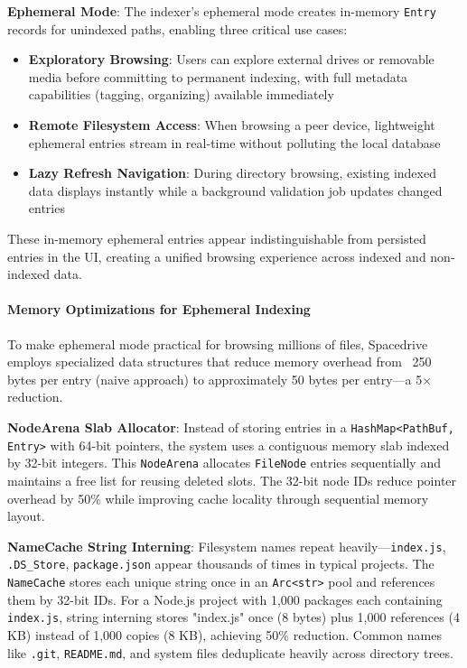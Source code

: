 \documentclass[sigconf]{acmart}
\begin{document}
\textbf{Ephemeral Mode}: The indexer's ephemeral mode creates in-memory \texttt{Entry} records for unindexed paths, enabling three critical use cases:

\begin{itemize}[noitemsep, topsep=0pt]
 \item \textbf{Exploratory Browsing}: Users can explore external drives or removable media before committing to permanent indexing, with full metadata capabilities (tagging, organizing) available immediately
 \item \textbf{Remote Filesystem Access}: When browsing a peer device, lightweight ephemeral entries stream in real-time without polluting the local database
 \item \textbf{Lazy Refresh Navigation}: During directory browsing, existing indexed data displays instantly while a background validation job updates changed entries
\end{itemize}

These in-memory ephemeral entries appear indistinguishable from persisted entries in the UI, creating a unified browsing experience across indexed and non-indexed data.

\paragraph{Memory Optimizations for Ephemeral Indexing}

To make ephemeral mode practical for browsing millions of files, Spacedrive employs specialized data structures that reduce memory overhead from ~250 bytes per entry (naive approach) to approximately 50 bytes per entry---a 5× reduction.

\textbf{NodeArena Slab Allocator}: Instead of storing entries in a \texttt{HashMap<PathBuf, Entry>} with 64-bit pointers, the system uses a contiguous memory slab indexed by 32-bit integers. This \texttt{NodeArena} allocates \texttt{FileNode} entries sequentially and maintains a free list for reusing deleted slots. The 32-bit node IDs reduce pointer overhead by 50\% while improving cache locality through sequential memory layout.

\textbf{NameCache String Interning}: Filesystem names repeat heavily---\texttt{index.js}, \texttt{.DS\_Store}, \texttt{package.json} appear thousands of times in typical projects. The \texttt{NameCache} stores each unique string once in an \texttt{Arc<str>} pool and references them by 32-bit IDs. For a Node.js project with 1,000 packages each containing \texttt{index.js}, string interning stores "index.js" once (8 bytes) plus 1,000 references (4 KB) instead of 1,000 copies (8 KB), achieving 50\% reduction. Common names like \texttt{.git}, \texttt{README.md}, and system files deduplicate heavily across directory trees.
\end{document}
